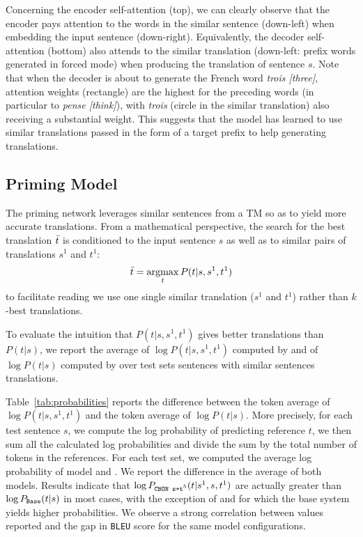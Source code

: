 Concerning the encoder self-attention (top), we can clearly observe that the encoder pays attention to the words in the similar sentence (down-left) when embedding the input sentence (down-right). 
%
Equivalently, the decoder self-attention (bottom) also attends to the similar translation (down-left: prefix words generated in forced mode) when producing the translation of sentence $s$. Note that when the decoder is about to generate the French word {\it trois [three]}, attention weights (rectangle) are the highest for the preceding words (in particular to {\it pense [think]}), with {\it trois} (circle in the similar translation) also receiving a substantial weight.
This suggests that the model has learned to use similar translations passed in the form of a target prefix to help generating translations.

\subsection*{Priming Model} 
The priming network leverages similar sentences from a TM so as to yield more accurate translations. From a mathematical perspective, the search for the best translation $\Bar{t}$ is conditioned to the input sentence $s$ as well as to similar pairs of translations $s^1$ and $t^1$:
\begin{equation*}
    \Bar{t} = \mathop{\operatorname*{argmax}}_{t}P(t|s,s^1,t^1)
\end{equation*}
\noindent to facilitate reading we use one single similar translation ($s^1$ and $t^1$) rather than $k$-best translations.

To evaluate the intuition that $P(t|s, s^1,t^1)$ gives better translations than $P(t|s)$, we report the average of $\log P(t|s,s^1,t^1)$ computed by  and of $\log P(t|s)$ computed by  over test sets sentences with similar sentences translations.

Table~\ref{tab:probabilities} reports the difference between the token average of $\log P(t|s,s^1,t^1)$ and the token average of $\log P(t|s)$. More precisely, for each test sentence $s$, we compute the log probability of predicting reference $t$, we then sum all the calculated log probabilities and divide the sum by the total number of tokens in the references. For each test set, we computed the average log probability of model  and . We report the difference in the average of both models. 
Results indicate that $\log P_{\texttt{{CBON s+t$^5$}}}(t|s^1,s,t^1)$ are actually greater than $\log P_{\texttt{{Base}}}(t|s)$ in most cases, with the exception of  and  for which the base system yields higher probabilities. We observe a strong correlation between values reported and the gap in \texttt{BLEU} score for the same model configurations.

